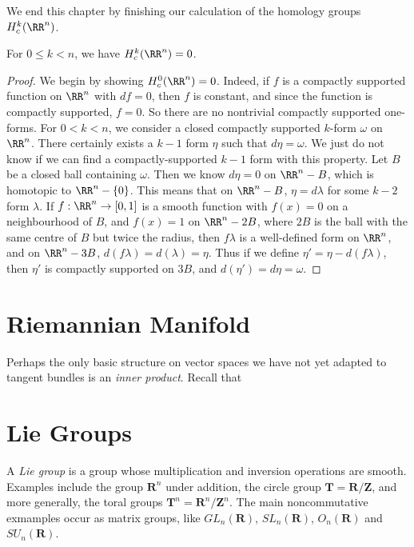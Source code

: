 We end this chapter by finishing our calculation of the homology groups $H^k_c(\RR^n)$.

\begin{theorem}
    For $0 \leq k < n$, we have $H^k_c(\RR^n) = 0$.
\end{theorem}
\begin{proof}
    We begin by showing $H^0_c(\RR^n) = 0$. Indeed, if $f$ is a compactly supported function on $\RR^n$ with $df = 0$, then $f$ is constant, and since the function is compactly supported, $f = 0$. So there are no nontrivial compactly supported one-forms. For $0 < k < n$, we consider a closed compactly supported $k$-form $\omega$ on $\RR^n$. There certainly exists a $k-1$ form $\eta$ such that $d\eta = \omega$. We just do not know if we can find a compactly-supported $k-1$ form with this property. Let $B$ be a closed ball containing $\omega$. Then we know $d\eta = 0$ on $\RR^n - B$, which is homotopic to $\RR^n - \{ 0 \}$. This means that on $\RR^n - B$, $\eta = d\lambda$ for some $k-2$ form $\lambda$. If $f: \RR^n \to [0,1]$ is a smooth function with $f(x) = 0$ on a neighbourhood of $B$, and $f(x) = 1$ on $\RR^n - 2B$, where $2B$ is the ball with the same centre of $B$ but twice the radius, then $f \lambda$ is a well-defined form on $\RR^n$, and on $\RR^n - 3B$, $d(f\lambda) = d(\lambda) = \eta$. Thus if we define $\eta' = \eta - d(f\lambda)$, then $\eta'$ is compactly supported on $3B$, and $d(\eta') = d\eta = \omega$.
\end{proof}




\chapter{Riemannian Manifold}

Perhaps the only basic structure on vector spaces we have not yet adapted to tangent bundles is an \emph{inner product}. Recall that






\chapter{Lie Groups}

A \emph{Lie group} is a group whose multiplication and inversion operations are smooth. Examples include the group $\mathbf{R}^n$ under addition, the circle group $\mathbf{T} = \mathbf{R}/\mathbf{Z}$, and more generally, the toral groups $\mathbf{T}^n = \mathbf{R}^n / \mathbf{Z}^n$. The main noncommutative exmamples occur as matrix groups, like $GL_n(\mathbf{R})$, $SL_n(\mathbf{R})$, $O_n(\mathbf{R})$ and $SU_n(\mathbf{R})$.

